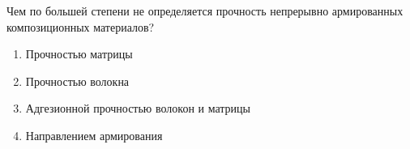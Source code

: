 
Чем по большей степени не определяется прочность непрерывно армированных композиционных материалов?

\begin{enumerate}
    \item Прочностью матрицы
    \item Прочностью волокна
    \item Адгезионной прочностью волокон и матрицы
    \item Направлением армирования
\end{enumerate}